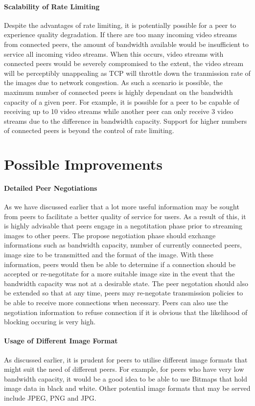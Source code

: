 \documentclass[10pt, twocolumn]{article}
\begin{document}
\paragraph{Scalability of Rate Limiting}
Despite the advantages of rate limiting, it is potentially possible for a peer to experience quality degradation. If there are too many incoming video streams from connected peers, the amount of bandwidth available would be insufficient to service all incoming video streams. When this occurs, video streams with connected peers would be severely compromised to the extent, the video stream will be perceptibly unappealing as TCP will throttle down the tranmission rate of the images due to network congestion. As such a scenario is possible, the maximum number of connected peers is highly dependant on the bandwidth capacity of a given peer. For example, it is possible for a peer to be capable of receiving up to 10 video streams while another peer can only receive 3 video streams due to the difference in bandwidth capacity. Support for higher numbers of connected peers is beyond the control of rate limiting.

\section{Possible Improvements}
\paragraph{Detailed Peer Negotiations}
As we have discussed earlier that a lot more useful information may be sought from peers to facilitate a better quality of service for users. As a result of this, it is highly advisable that peers engage in a negotitation phase prior to streaming images to other peers. The propose negotiation phase should exchange informations such as bandwidth capacity, number of currently connected peers, image size to be transmitted and the format of the image. With these information, peers would then be able to determine if a connection should be accepted or re-negotitate for a more suitable image size in the event that the bandwidth capacity was not at a desirable state. The peer negotation should also be extended so that at any time, peers may re-negotate transmission policies to be able to receive more connections when necessary. Peers can also use the negotiation information to refuse connection if it is obvious that the likelihood of blocking occuring is very high.

\paragraph{Usage of Different Image Format}
As discussed earlier, it is prudent for peers to utilise different image formats that might suit the need of different peers. For example, for peers who have very low bandwidth capacity, it would be a good idea to be able to use Bitmaps that hold image data in black and white. Other potential image formats that may be served include JPEG, PNG and JPG. 
\end{document}
